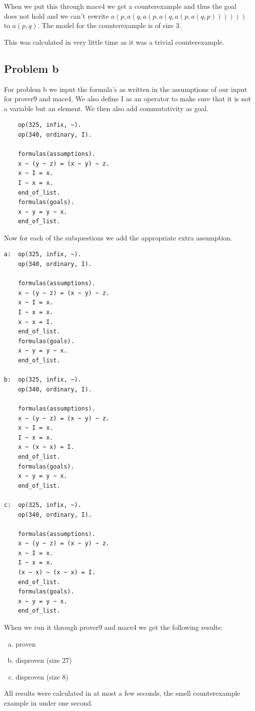 \documentclass[12pt]{scrartcl}
\begin{document}
When we put this through mace4 we get a counterexample and thus the goal does not hold and we can't rewrite $a(p, a(q, a(p, a(q, a(p,  a(q, p))))))$ to $a(p, q)$. The model for the counterexample is of size 3.

This was calculated in very little time as it was a trivial counterexample.

\subsection{Problem b}
For problem b we input the formula's as written in the assumptions of our input for prover9 and mace4. We also define I as an operator to make sure that it is not a variable but an element. We then also add commutativity as goal.
\begin{verbatim}
    op(325, infix, ~).
    op(340, ordinary, I).

    formulas(assumptions).
    x ~ (y ~ z) = (x ~ y) ~ z.
    x ~ I = x.
    I ~ x = x.
    end_of_list.
    formulas(goals).
    x ~ y = y ~ x.
    end_of_list.
\end{verbatim}
Now for each of the subquestions we add the appropriate extra assumption.
\begin{verbatim}
a:  op(325, infix, ~).
    op(340, ordinary, I).

    formulas(assumptions).
    x ~ (y ~ z) = (x ~ y) ~ z.
    x ~ I = x.
    I ~ x = x.
    x ~ x = I.
    end_of_list.
    formulas(goals).
    x ~ y = y ~ x.
    end_of_list.

b:  op(325, infix, ~).
    op(340, ordinary, I).

    formulas(assumptions).
    x ~ (y ~ z) = (x ~ y) ~ z.
    x ~ I = x.
    I ~ x = x.
    x ~ (x ~ x) = I.
    end_of_list.
    formulas(goals).
    x ~ y = y ~ x.
    end_of_list.

c:  op(325, infix, ~).
    op(340, ordinary, I).

    formulas(assumptions).
    x ~ (y ~ z) = (x ~ y) ~ z.
    x ~ I = x.
    I ~ x = x.
    (x ~ x) ~ (x ~ x) = I.
    end_of_list.
    formulas(goals).
    x ~ y = y ~ x.
    end_of_list.
\end{verbatim}
When we run it through prover9 and mace4 we get the following results:
\begin{enumerate}[(a)]
    \item proven
    \item disproven (size 27)
    \item disproven (size 8)
\end{enumerate}
All results were calculated in at most a few seconds, the smell counterexample example in under one second.
\end{document}
